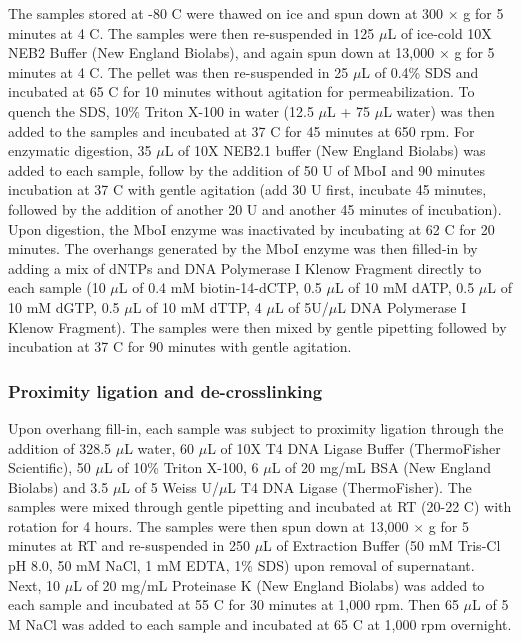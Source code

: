 The samples stored at -80 \textdegree C were thawed on ice and spun down at 300 $\times$ g for 5 minutes at 4 \textdegree C.
The samples were then re-suspended in 125 $\mu$L of ice-cold 10X NEB2 Buffer (New England Biolabs), and again spun down at 13,000 $\times$ g for 5 minutes at 4 \textdegree C.
The pellet was then re-suspended in 25 $\mu$L of 0.4\% SDS and incubated at 65 \textdegree C for 10 minutes without agitation for permeabilization.
To quench the SDS, 10\% Triton X-100 in water (12.5 $\mu$L + 75 $\mu$L water) was then added to the samples and incubated at 37 \textdegree C for 45 minutes at 650 rpm.
For enzymatic digestion, 35 $\mu$L of 10X NEB2.1 buffer (New England Biolabs) was added to each sample, follow by the addition of 50 U of MboI and 90 minutes incubation at 37 \textdegree C with gentle agitation (add 30 U first, incubate 45 minutes, followed by the addition of another 20 U and another 45 minutes of incubation).
Upon digestion, the MboI enzyme was inactivated by incubating at 62 \textdegree C for 20 minutes.
The overhangs generated by the MboI enzyme was then filled-in by adding a mix of dNTPs and DNA Polymerase I Klenow Fragment directly to each sample (10 $\mu$L of 0.4 mM biotin-14-dCTP, 0.5 $\mu$L of 10 mM dATP, 0.5 $\mu$L of 10 mM dGTP, 0.5 $\mu$L of 10 mM dTTP, 4 $\mu$L of 5U/$\mu$L DNA Polymerase I Klenow Fragment).
The samples were then mixed by gentle pipetting followed by incubation at 37 \textdegree C for 90 minutes with gentle agitation.

\subsubsection{Proximity ligation and de-crosslinking}

Upon overhang fill-in, each sample was subject to proximity ligation through the addition of 328.5 $\mu$L water, 60 $\mu$L of 10X T4 DNA Ligase Buffer (ThermoFisher Scientific), 50 $\mu$L of 10\% Triton X-100, 6 $\mu$L of 20 mg/mL BSA (New England Biolabs) and 3.5 $\mu$L of 5 Weiss U/$\mu$L T4 DNA Ligase (ThermoFisher).
The samples were mixed through gentle pipetting and incubated at RT (20-22 \textdegree C) with rotation for 4 hours.
The samples were then spun down at 13,000 $\times$ g for 5 minutes at RT and re-suspended in 250 $\mu$L of Extraction Buffer (50 mM Tris-Cl pH 8.0, 50 mM NaCl, 1 mM EDTA, 1\% SDS) upon removal of supernatant.
Next, 10 $\mu$L of 20 mg/mL Proteinase K (New England Biolabs) was added to each sample and incubated at 55 \textdegree C for 30 minutes at 1,000 rpm.
Then 65 $\mu$L of 5 M NaCl was added to each sample and incubated at 65 \textdegree C at 1,000 rpm overnight.

